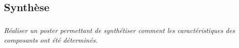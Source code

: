 \subsection*{Synthèse}
\subparagraph{}
\textit{Réaliser un poster permettant de synthétiser comment les caractéristiques des composants ont été déterminés.}
%
\ifprof
\else
\footnotesize

\fi

\normalsize
